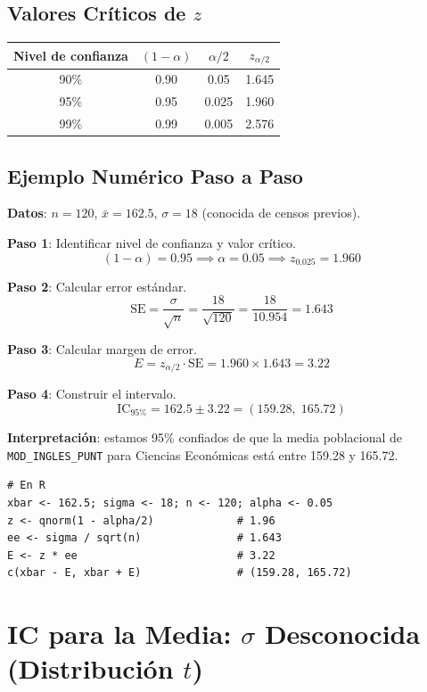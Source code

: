 \documentclass[11pt, a4paper]{article}
\begin{document}
\subsection{Valores Cr\'iticos de $z$}

\begin{center}
\begin{tabular}{cccc}
\toprule
\textbf{Nivel de confianza} & $(1-\alpha)$ & $\alpha/2$ & $z_{\alpha/2}$ \\
\midrule
90\% & 0.90 & 0.05 & 1.645 \\
95\% & 0.95 & 0.025 & 1.960 \\
99\% & 0.99 & 0.005 & 2.576 \\
\bottomrule
\end{tabular}
\end{center}

\subsection{Ejemplo Num\'erico Paso a Paso}

\textbf{Datos}: $n = 120$, $\bar{x} = 162.5$, $\sigma = 18$ (conocida de censos previos).

\textbf{Paso 1}: Identificar nivel de confianza y valor cr\'itico.
\[
(1-\alpha) = 0.95 \implies \alpha = 0.05 \implies z_{0.025} = 1.960
\]

\textbf{Paso 2}: Calcular error est\'andar.
\[
\text{SE} = \frac{\sigma}{\sqrt{n}} = \frac{18}{\sqrt{120}} = \frac{18}{10.954} = 1.643
\]

\textbf{Paso 3}: Calcular margen de error.
\[
E = z_{\alpha/2} \cdot \text{SE} = 1.960 \times 1.643 = 3.22
\]

\textbf{Paso 4}: Construir el intervalo.
\[
\text{IC}_{95\%} = 162.5 \pm 3.22 = (159.28, \; 165.72)
\]

\textbf{Interpretaci\'on}: estamos 95\% confiados de que la media poblacional de \texttt{MOD\_INGLES\_PUNT} para Ciencias Econ\'omicas est\'a entre 159.28 y 165.72.

\begin{lstlisting}
# En R
xbar <- 162.5; sigma <- 18; n <- 120; alpha <- 0.05
z <- qnorm(1 - alpha/2)             # 1.96
ee <- sigma / sqrt(n)               # 1.643
E <- z * ee                         # 3.22
c(xbar - E, xbar + E)               # (159.28, 165.72)
\end{lstlisting}

\section{IC para la Media: $\sigma$ Desconocida (Distribuci\'on $t$)}
\end{document}
